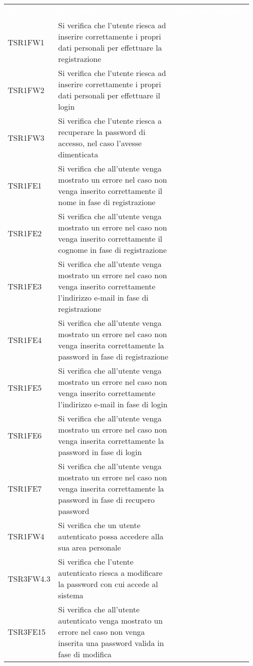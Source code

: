 \renewcommand{\arraystretch}{1.5}
\begin{longtable}{ m{}<{\centering}  m{}<{\centering}  m{}<{\centering} }
	\rowcolor{darkblue}
	\textcolor{white}{\textbf{Test}} &\textcolor{white}{\textbf{Descrizione}} & \textcolor{white}{\textbf{Implementazione}} \\ 

	TSR1FW1 & Si verifica che l'utente riesca ad inserire correttamente i propri dati personali per effettuare la registrazione & \Su \\
	TSR1FW2 & Si verifica che l'utente riesca ad inserire correttamente i propri dati personali per effettuare il login & \Su \\
	TSR1FW3 & Si verifica che l'utente riesca a recuperare la password di accesso, nel caso l'avesse dimenticata & \Su \\
	TSR1FE1 & Si verifica che all'utente venga mostrato un errore nel caso non venga inserito correttamente il nome in fase di registrazione & \Su \\
	TSR1FE2 & Si verifica che all'utente venga mostrato un errore nel caso non venga inserito correttamente il cognome in fase di registrazione & \Su \\
	TSR1FE3 & Si verifica che all'utente venga mostrato un errore nel caso non venga inserito correttamente l'indirizzo e-mail in fase di registrazione & \Su \\
	TSR1FE4 & Si verifica che all'utente venga mostrato un errore nel caso non venga inserita correttamente la password in fase di registrazione & \Su \\
	TSR1FE5 & Si verifica che all'utente venga mostrato un errore nel caso non venga inserito correttamente l'indirizzo e-mail in fase di login & \Su \\
	TSR1FE6 & Si verifica che all'utente venga mostrato un errore nel caso non venga inserita correttamente la password in fase di login & \Su \\
	TSR1FE7 & Si verifica che all'utente venga mostrato un errore nel caso non venga inserita correttamente la password in fase di recupero password & \Su \\
	TSR1FW4 & Si verifica che un utente autenticato possa accedere alla sua area personale & \Su \\
	TSR3FW4.3 & Si verifica che l'utente autenticato riesca a modificare la password con cui accede al sistema & \Su \\
	TSR3FE15 & Si verifica che all'utente autenticato venga mostrato un errore nel caso non venga inserita una password valida in fase di modifica & \Su \\

\end{longtable}
